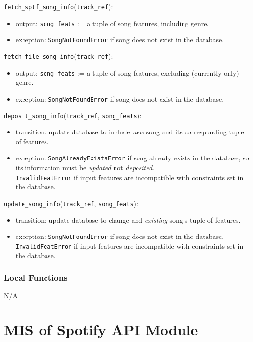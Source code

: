 \documentclass[12pt, titlepage]{article}
\begin{document}
\noindent \texttt{fetch\_sptf\_song\_info}(\texttt{track\_ref}):
\begin{itemize}
\item output: \texttt{song\_feats} := a tuple of song features, including genre.
\item exception: \texttt{SongNotFoundError} if song does not exist in the database.
\end{itemize}

\noindent \texttt{fetch\_file\_song\_info}(\texttt{track\_ref}):
\begin{itemize}
\item output: \texttt{song\_feats} := a tuple of song features, excluding (currently only) genre.
\item exception: \texttt{SongNotFoundError} if song does not exist in the database.
\end{itemize}

\noindent \texttt{deposit\_song\_info}(\texttt{track\_ref}, \texttt{song\_feats}):
\begin{itemize}
\item transition: update database to include \emph{new} song and its corresponding tuple of features.
\item exception: \texttt{SongAlreadyExistsError} if song already exists in the database, so its information must be \emph{updated} not \emph{deposited}. \\ \texttt{InvalidFeatError} if input features are incompatible with constraints set in the database.
\end{itemize}

\noindent \texttt{update\_song\_info}(\texttt{track\_ref}, \texttt{song\_feats}):
\begin{itemize}
\item transition: update database to change and \emph{existing} song's tuple of features.
\item exception: \texttt{SongNotFoundError} if song does not exist in the database. \\ \texttt{InvalidFeatError} if input features are incompatible with constraints set in the database.
\end{itemize}

\subsubsection{Local Functions}
N/A

\newpage

\section{MIS of Spotify API Module} 
\end{document}
